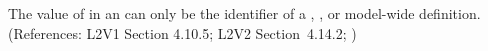 The value of  in an \EventAssignment can only be the
identifier of a \Compartment, \Species, or model-wide \Parameter
definition.  (References: L2V1 Section 4.10.5; L2V2 Section~4.14.2;
)
